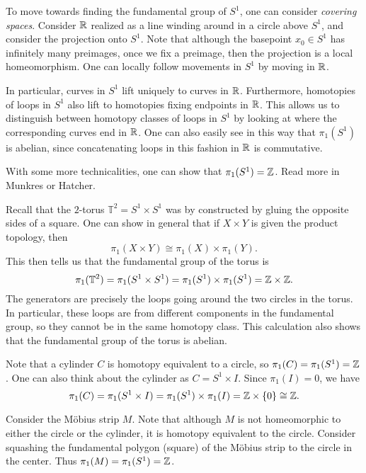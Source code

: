 \begin{remark}
  To move towards finding the fundamental group of
  $S^1$, one can consider \emph{covering spaces}.
  Consider $\mathbb{R}$ realized as a line winding
  around in a circle above $S^1$, and consider
  the projection onto $S^1$. Note that although the
  basepoint $x_0 \in S^1$ has infinitely many
  preimages, once we fix a preimage, then
  the projection is a local homeomorphism.
  One can locally follow movements in $S^1$
  by moving in $\mathbb{R}$.

  In particular, curves in $S^1$ lift uniquely
  to curves
  in $\mathbb{R}$. Furthermore, homotopies of loops in $S^1$
  also lift to homotopies fixing endpoints in $\mathbb{R}$.
  This allows
  us to distinguish between homotopy classes
  of loops in $S^1$ by looking at where the
  corresponding curves end in $\mathbb{R}$. One can also
  easily see in this way that $\pi_1(S^1)$ is
  abelian, since concatenating loops in this
  fashion in $\mathbb{R}$ is commutative.

  With some more technicalities, one can show
  that $\pi_1(S^1) = \mathbb{Z}$. Read more in Munkres
  or Hatcher.
\end{remark}

\begin{example}
  Recall that the $2$-torus
  $\mathbb{T}^2 = S^1 \times S^1$ was by
  constructed by gluing the opposite sides of a
  square. One can show in general that
  if $X \times Y$ is given the product topology, then
  \[
    \pi_1(X \times Y) \cong \pi_1(X) \times \pi_1(Y).
  \]
  This then tells us that
  the fundamental group of the torus is
  \[
    \pi_1(\mathbb{T}^2) = \pi_1(S^1 \times S^1)
    = \pi_1(S^1) \times \pi_1(S^1) = \mathbb{Z} \times \mathbb{Z}.
  \]
  The generators are precisely the loops going
  around the two circles in the torus. In particular,
  these loops are from different
  components in the fundamental group, so
  they cannot be in the same homotopy class.
  This calculation
  also shows that the fundamental group of the
  torus is abelian.
\end{example}

\begin{example}
  Note that a cylinder $C$ is homotopy equivalent
  to a circle, so $\pi_1(C) = \pi_1(S^1) = \mathbb{Z}$.
  One can also think about the cylinder as
  $C = S^1 \times I$. Since $\pi_1(I) = 0$, we have
  \[
    \pi_1(C) = \pi_1(S^1 \times I) = \pi_1(S^1) \times \pi_1(I) = \mathbb{Z} \times \{0\} \cong \mathbb{Z}.
  \]
\end{example}

\begin{example}
  Consider the M\"obius strip $M$. Note that
  although $M$ is not homeomorphic to either the
  circle or the cylinder, it is homotopy equivalent
  to the circle. Consider squashing the
  fundamental polygon (square) of the M\"obius strip
  to the circle in the center.
  Thus $\pi_1(M) = \pi_1(S^1) = \mathbb{Z}$.
\end{example}


